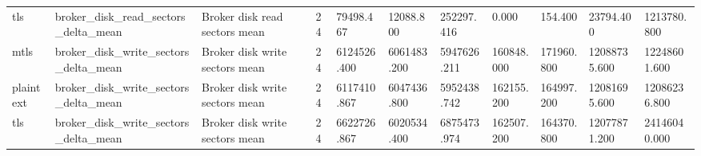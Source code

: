 \begin{longtable}{lllllllllll}
tls & broker\_disk\_read\_sectors\_delta\_mean & Broker disk read sectors mean & 24 & 79498.467 & 12088.800 & 252297.416 & 0.000 & 154.400 & 23794.400 & 1213780.800 \\
mtls & broker\_disk\_write\_sectors\_delta\_mean & Broker disk write sectors mean & 24 & 6124526.400 & 6061483.200 & 5947626.211 & 160848.000 & 171960.800 & 12088735.600 & 12248601.600 \\
plaintext & broker\_disk\_write\_sectors\_delta\_mean & Broker disk write sectors mean & 24 & 6117410.867 & 6047436.800 & 5952438.742 & 162155.200 & 164997.200 & 12081695.600 & 12086236.800 \\
tls & broker\_disk\_write\_sectors\_delta\_mean & Broker disk write sectors mean & 24 & 6622726.867 & 6020534.400 & 6875473.974 & 162507.200 & 164370.800 & 12077871.200 & 24146040.000 \\
\hline
\end{longtable}
